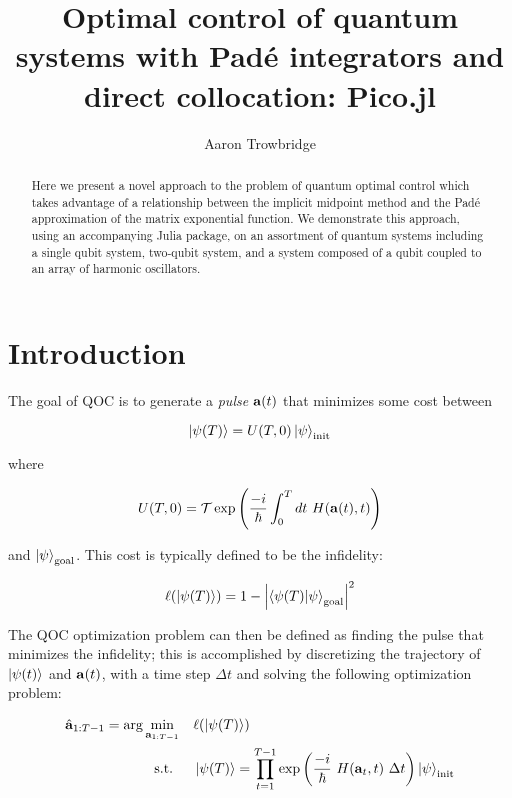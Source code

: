 \documentclass{article}
\title{Optimal control of quantum systems with Pad\'e integrators and direct collocation: Pico.jl}
\author{Aaron Trowbridge}
\date{}
\begin{document}
\maketitle


\begin{abstract}
  Here we present a novel approach to the problem of quantum optimal control which takes advantage of a relationship between the implicit midpoint method and the Pad\'e approximation of the matrix exponential function. We demonstrate this approach, using an accompanying Julia package, on an assortment of quantum systems including a single qubit system, two-qubit system, and a system composed of a qubit coupled to an array of harmonic oscillators.
\end{abstract}

\tableofcontents

\newpage


\section{Introduction}

The goal of QOC is to generate a \textit{pulse} $\vb{a}(t)$ that minimizes some cost between 

\begin{equation} 
  \ket{\psi(T)} = U(T, 0) \ket{\psi}_{\text{init}}
\end{equation}

where

\begin{equation}
  U(T, 0) = \mathcal{T} \exp \qty( \frac{-i}{\hbar} \int_0^T dt \ H(\vb{a}(t), t)) 
\end{equation}

and $\ket{\psi}_{\text{goal}}$. This cost is typically defined to be the infidelity:

\begin{equation}
  \ell \qty(\ket{\psi(T)}) = 1 - \abs{\bra{\psi(T)} \ket{\psi}_{\text{goal}}}^2
\end{equation}

The QOC optimization problem can then be defined as finding the pulse that minimizes the infidelity; this is accomplished by discretizing the trajectory of $\ket{\psi(t)}$ and $\vb{a}(t)$, with a time step $\Delta t$ and solving the following optimization problem:

\begin{align*}
  \hat{\vb{a}}_{1:T-1} = \arg \min_{\vb{a}_{1:T-1}} \quad &\ell \qty(\ket{\psi(T)})\\
  \text{s.t. } \quad 
    & \ket{\psi(T)} = \prod_{t=1}^{T-1} \exp \qty( \frac{-i}{\hbar} \ H(\vb{a}_t, t) \ \Delta t) \ket{\psi}_{\text{init}} \\
\end{align*}
\end{document}
